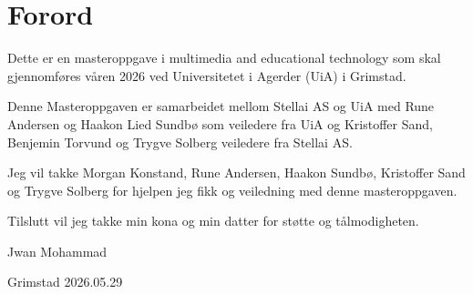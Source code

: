 \chapter*{Forord}
\setlength{\parindent}{0pt}      %

Dette er en masteroppgave i multimedia and educational technology som skal gjennomføres våren 2026 ved Universitetet i Agerder (UiA) i Grimstad.

\vspace{5mm}
Denne Masteroppgaven er samarbeidet mellom Stellai AS og UiA med Rune Andersen og Haakon Lied Sundbø som veiledere fra UiA og Kristoffer Sand, Benjemin Torvund og Trygve Solberg veiledere fra Stellai AS. 

\vspace{5mm}
Jeg vil takke Morgan Konstand, Rune Andersen, Haakon Sundbø, Kristoffer Sand og Trygve Solberg  for hjelpen jeg fikk og veiledning med denne masteroppgaven.

\vspace{5mm}
Tilslutt vil jeg takke min kona og min datter for støtte og tålmodigheten.

    
\vspace{24mm}
    
Jwan Mohammad
    
\vspace{1mm}
    
Grimstad 2026.05.29



